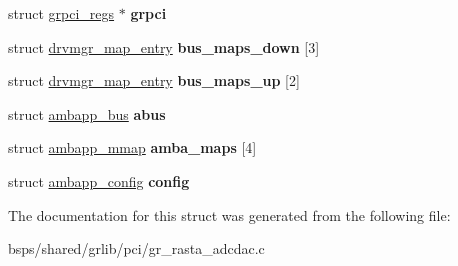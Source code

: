 \begin{DoxyCompactItemize}
struct \mbox{\hyperlink{structgrpci__regs}{grpci\+\_\+regs}} $\ast$ {\bfseries grpci}
\item 
\mbox{\label{structgr__rasta__adcdac__priv_a1e917bc28c323d05927bc4ab3a62f2cc}} 
struct \mbox{\hyperlink{structdrvmgr__map__entry}{drvmgr\+\_\+map\+\_\+entry}} {\bfseries bus\+\_\+maps\+\_\+down} \mbox{[}3\mbox{]}
\item 
\mbox{\label{structgr__rasta__adcdac__priv_a9183a56b4cb8c796b0bfe16979a890f6}} 
struct \mbox{\hyperlink{structdrvmgr__map__entry}{drvmgr\+\_\+map\+\_\+entry}} {\bfseries bus\+\_\+maps\+\_\+up} \mbox{[}2\mbox{]}
\item 
\mbox{\label{structgr__rasta__adcdac__priv_a14ab125600bfa7b4389489ab1a7948f3}} 
struct \mbox{\hyperlink{structambapp__bus}{ambapp\+\_\+bus}} {\bfseries abus}
\item 
\mbox{\label{structgr__rasta__adcdac__priv_a728fa43aa2031dcfdd065d9d4ea692ad}} 
struct \mbox{\hyperlink{structambapp__mmap}{ambapp\+\_\+mmap}} {\bfseries amba\+\_\+maps} \mbox{[}4\mbox{]}
\item 
\mbox{\label{structgr__rasta__adcdac__priv_a78900c81756900ad92b6b3289e90b4a4}} 
struct \mbox{\hyperlink{structambapp__config}{ambapp\+\_\+config}} {\bfseries config}
\end{DoxyCompactItemize}


The documentation for this struct was generated from the following file\+:\begin{DoxyCompactItemize}
\item 
bsps/shared/grlib/pci/gr\+\_\+rasta\+\_\+adcdac.\+c\end{DoxyCompactItemize}
